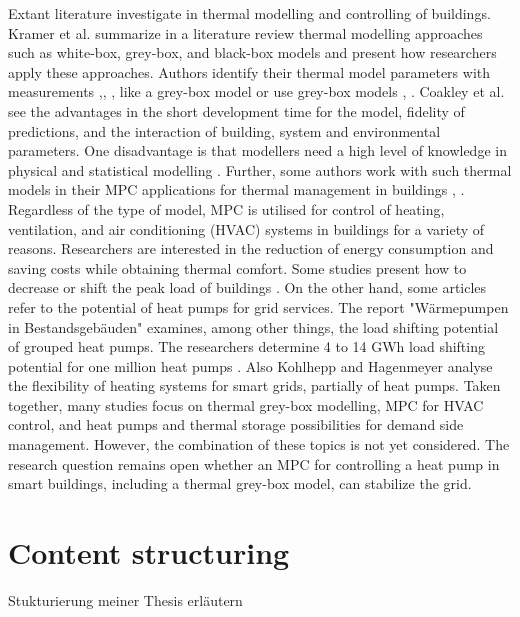     Extant literature investigate in thermal modelling and controlling of buildings. Kramer et al. \cite{Kramer.2012} summarize in a literature review thermal modelling approaches such as white-box, grey-box, and black-box models and present how researchers apply these approaches. Authors identify their thermal model parameters with measurements \cite{Siroky.2011},\cite{Hazyuk.2012}, \cite{Park.2011}, like a grey-box model or use grey-box models \cite{Freund.2020}, \cite{EvelynSperber.2019}. Coakley et al. \cite{Coakley.2014} see the advantages in the short development time for the model, fidelity of predictions, and the interaction of building, system and environmental parameters. One disadvantage is that modellers need a high level of knowledge in physical and statistical modelling \cite{Coakley.2014}.
    \newline
    Further, some authors work with such thermal models in their MPC applications for thermal management in buildings \cite{JiriCigler.}, \cite{Hazyuk.2012b}. 
    \newline
    Regardless of the type of model, MPC is utilised for control of heating, ventilation, and air conditioning (HVAC) systems in buildings for a variety of reasons. Researchers are interested in the reduction of energy consumption \cite{Hazyuk.2012b} and saving costs \cite{Zwickel.2019} while obtaining thermal comfort. Some studies present how to decrease or shift the peak load of buildings \cite{Oldewurtel.2010}.
    \newline
    On the other hand, some articles refer to the potential of heat pumps for grid services.
    The report "Wärmepumpen in Bestandsgebäuden" examines, among other things, the load shifting potential of grouped heat pumps. The researchers determine 4 to 14 GWh load shifting potential for one million heat pumps \cite{WPimBestand.2020}.
    Also Kohlhepp and Hagenmeyer \cite{Kohlhepp.2017} analyse the flexibility of heating systems for smart grids, partially of heat pumps. 
    \newline
    Taken together, many studies focus on thermal grey-box modelling, MPC for HVAC control, and heat pumps and thermal storage possibilities for demand side management. However, the combination of these topics is not yet considered. The research question remains open whether an MPC for controlling a heat pump in smart buildings, including a thermal grey-box model, can stabilize the grid.  
 




\section{Content structuring}
\label{section:contentstructuring}
Stukturierung meiner Thesis erläutern